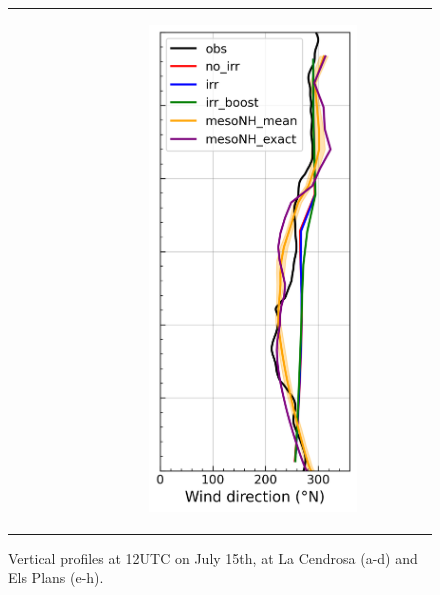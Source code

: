 \begin{figure}[hbtp]
{\begin{tabular}{@{}cccc@{}}
\begin{subfigure}[t]{0.283\textwidth}
        \end{subfigure} &
        \begin{subfigure}[t]{0.283\textwidth}
            \caption{}
            \includegraphics[width=\textwidth]{images/chap5/profiles/profile_elsplans_wind_direction_1507_.png}
        \end{subfigure} \\
    \end{tabular}
    }
    \caption{Vertical profiles at 12UTC on July 15th, at La Cendrosa (a-d) and Els Plans (e-h).}
    \label{fig:profiles_cendrosa_1507}
\end{figure}

